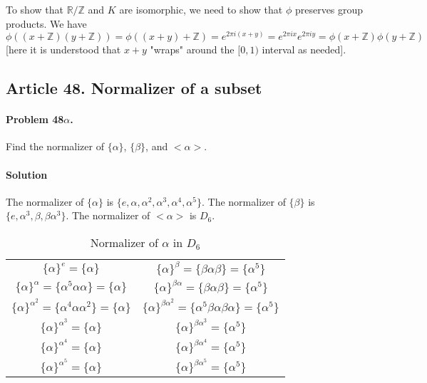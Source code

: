 To show that $\mathbb{R/Z}$ and $K$ are isomorphic, we need to show that $\phi$
preserves group products. We have
$ \phi ((x+\mathbb{Z})(y+\mathbb{Z})) = \phi ((x+y)+\mathbb{Z}) = e^{2\pi i (x+y)}
= e^{2\pi i x}e^{2 \pi i y} = \phi (x+\mathbb{Z}) \phi (y+\mathbb{Z})$ [here it
is understood that $x+y$ "wraps" around the $[0,1)$ interval as needed].

\subsection{Article 48. Normalizer of a subset}

\paragraph{Problem 48$\alpha$.}
Find the normalizer of $\{\alpha\}$, $\{\beta\}$, and $<\alpha>$.

\paragraph*{Solution}
The normalizer of $\{\alpha\}$ is $\{e, \alpha, \alpha^2, \alpha^3,
\alpha^4, \alpha^5\}$.
The normalizer of $\{\beta\}$ is $\{e, \alpha^3,
\beta, \beta\alpha^3\}$.
The normalizer of $<\alpha>$ is $D_6$.

\begin{table}[ht]
\begin{center}
\begin{tabular}[ht]{cc}
$\{\alpha\}^e = \{\alpha\}$  &
  $\{\alpha\}^\beta = \{\beta \alpha \beta\} = \{\alpha^5\}$ \\
$\{\alpha\}^{\alpha} = \{\alpha^5 \alpha \alpha\} = \{\alpha\}$ 
  &  $\{\alpha\}^{\beta\alpha} = \{\beta \alpha \beta\} = \{\alpha^5\}$ \\
$\{\alpha\}^{\alpha^2} = \{\alpha^4 \alpha \alpha^2\} = \{\alpha\}$
  &  $\{\alpha\}^{\beta\alpha^2} = \{\alpha^5 \beta \alpha \beta \alpha\} = \{\alpha^5\}$ \\
$\{\alpha\}^{\alpha^3} = \{\alpha\}$
  &  $\{\alpha\}^{\beta\alpha^3} = \{\alpha^5\}$ \\
$\{\alpha\}^{\alpha^4} = \{\alpha\}$
  &  $\{\alpha\}^{\beta\alpha^4} = \{\alpha^5\}$ \\
$\{\alpha\}^{\alpha^5} = \{\alpha\}$
  &  $\{\alpha\}^{\beta\alpha^5} = \{\alpha^5\}$ \\
\end{tabular}
\end{center}
\caption{Normalizer of $\alpha$ in $D_6$}
\label{table:normalizers1_in_d6}
\end{table}

